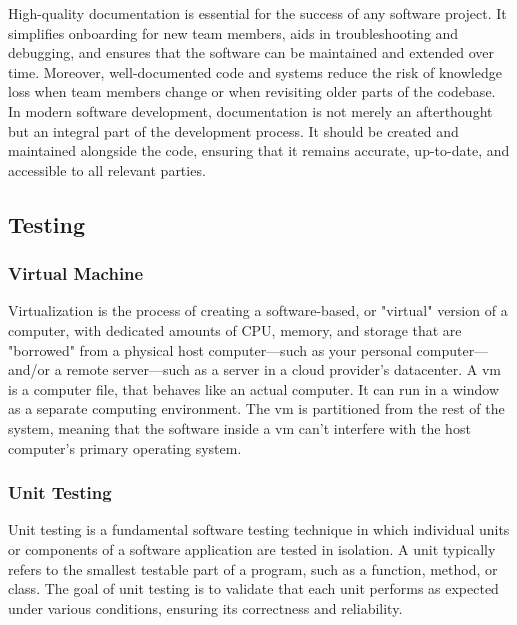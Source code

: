High-quality documentation is essential for the success of any software project. It simplifies onboarding for new team members, aids in troubleshooting and debugging, and ensures that the software can be maintained and extended over time. Moreover, well-documented code and systems reduce the risk of knowledge loss when team members change or when revisiting older parts of the codebase. \cite{geeksforgeeks:doc} \\

In modern software development, documentation is not merely an afterthought but an integral part of the development process. It should be created and maintained alongside the code, ensuring that it remains accurate, up-to-date, and accessible to all relevant parties.

\subsection{Testing}
\label{subsec:testing}

\subsubsection*{Virtual Machine}
\label{subsubsec:virtual-machine}


Virtualization is the process of creating a software-based, or "virtual" version of a computer, with dedicated amounts of CPU, memory, and storage that are "borrowed" from a physical host computer—such as your personal computer— and/or a remote server—such as a server in a cloud provider's datacenter. A \gls{vm} is a computer file, that behaves like an actual computer. It can run in a window as a separate computing environment. The \gls{vm} is partitioned from the rest of the system, meaning that the software inside a \gls{vm} can't interfere with the host computer's primary operating system.

\subsubsection*{Unit Testing}
\label{subsubsec:unit-testing}

Unit testing is a fundamental software testing technique in which individual units or components of a software application are tested in isolation. A unit typically refers to the smallest testable part of a program, such as a function, method, or class. The goal of unit testing is to validate that each unit performs as expected under various conditions, ensuring its correctness and reliability. \cite{geeksforgeeks:unit-test} \\

